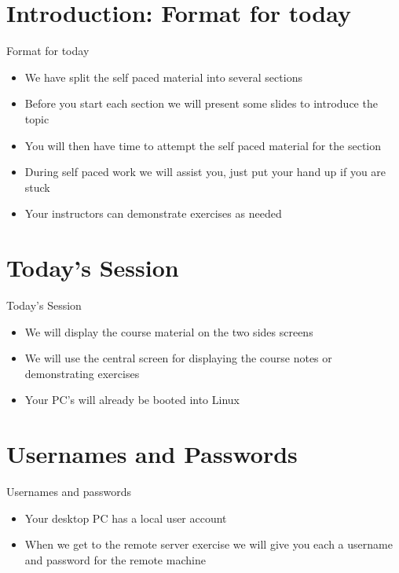 \section{Introduction: Format for today}
\begin{frame}{Format for today}
\begin{itemize}
\item We have split the self paced material into several sections
\item Before you start each section we will present some slides to introduce the topic
\item You will then have time to attempt the self paced material for the section
\item During self paced work we will assist you, just put your hand up if you are stuck
\item Your instructors can demonstrate exercises as needed
\end{itemize}
\end{frame}

\section{Today's Session}
\begin{frame}{Today's Session}
\begin{itemize}
\item We will display the course material on the two sides screens
\item We will use the central screen for displaying the course notes or demonstrating exercises
\item Your PC's will already be booted into Linux 
\end{itemize}
\end{frame}

\section{Usernames and Passwords}
\begin{frame}{Usernames and passwords}
\begin{itemize}
\item Your desktop PC has a local user account 
\item When we get to the remote server exercise we will give you each a username and password for the remote machine
\end{itemize}
\end{frame}


